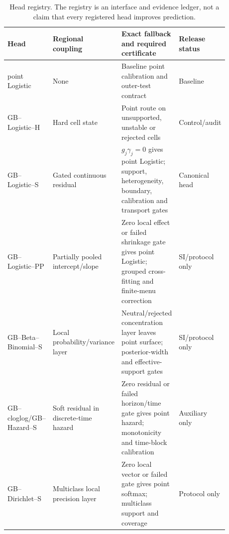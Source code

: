 \documentclass[11pt,a4paper]{article}
\numberwithin{equation}{section}
\theoremstyle{definition}\newtheorem{definition}[theorem]{Definition}
\theoremstyle{remark}\newtheorem{remark}[theorem]{Remark}
\begin{document}
\begin{table}[h]
\centering
\footnotesize
\begin{tabular}{p{0.17\linewidth} p{0.22\linewidth} p{0.34\linewidth} p{0.15\linewidth}}
\toprule
Head & Regional coupling & Exact fallback and required certificate & Release status\\
\midrule
point Logistic & None & Baseline point calibration and outer-test contract & Baseline\\
GB--Logistic--H & Hard cell state & Point route on unsupported, unstable or rejected cells & Control/audit\\
GB--Logistic--S & Gated continuous residual & $g_j\gamma_j=0$ gives point Logistic; support, heterogeneity, boundary, calibration and transport gates & Canonical head\\
GB--Logistic--PP & Partially pooled intercept/slope & Zero local effect or failed shrinkage gate gives point Logistic; grouped cross-fitting and finite-menu correction & SI/protocol only\\
GB--Beta--Binomial--S & Local probability/variance layer & Neutral/rejected concentration layer leaves point surface; posterior-width and effective-support gates & SI/protocol only\\
GB--cloglog/GB--Hazard--S & Soft residual in discrete-time hazard & Zero residual or failed horizon/time gate gives point hazard; monotonicity and time-block calibration & Auxiliary only\\
GB--Dirichlet--S & Multiclass local precision layer & Zero local vector or failed gate gives point softmax; multiclass support and coverage & Protocol only\\
\bottomrule
\end{tabular}
\caption{Head registry. The registry is an interface and evidence ledger, not a claim that every registered head improves prediction.}
\label{tab:head_registry}
\end{table}
\end{document}
